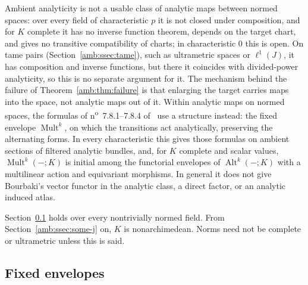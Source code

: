 \documentclass[11pt]{amsart}
\theoremstyle{definition}
\theoremstyle{remark}
\numberwithin{equation}{section}
\newcommand{\Alt}{\operatorname{Alt}}
\newcommand{\Mult}{\operatorname{Mult}}
\theoremstyle{plain}
\theoremstyle{definition}
\theoremstyle{plain}
\begin{document}
Ambient analyticity is not a usable class of analytic maps between normed spaces: over every field of characteristic $p$ it is not closed under composition, and for $K$ complete it has no inverse function theorem, depends on the target chart, and gives no transitive compatibility of charts; in characteristic $0$ this is open. On tame pairs (Section~\ref{amb:ssec:tame}), such as ultrametric spaces or $\ell^1(J)$, it has composition and inverse functions, but there it coincides with divided-power analyticity, so this is no separate argument for it. The mechanism behind the failure of Theorem~\ref{amb:thm:failure} is that enlarging the target carries maps into the space, not analytic maps out of it. Within analytic maps on normed spaces, the formulas of n\textsuperscript{o}~7.8.1--7.8.4 of~\cite{Bou} use a structure instead: the fixed envelope $\Mult^k$, on which the transitions act analytically, preserving the alternating forms. In every characteristic this gives those formulas on ambient sections of filtered analytic bundles, and, for $K$ complete and scalar values, $\Mult^k(-;K)$ is initial among the functorial envelopes of $\Alt^k(-;K)$ with a multilinear action and equivariant morphisms. In general it does not give Bourbaki's vector functor in the analytic class, a direct factor, or an analytic induced atlas.

Section~\ref{amb:ssec:fixed} holds over every nontrivially normed field. From Section~\ref{amb:ssec:some-j} on, $K$ is nonarchimedean. Norms need not be complete or ultrametric unless this is said.

\subsection{Fixed envelopes}\label{amb:ssec:fixed}
\end{document}
